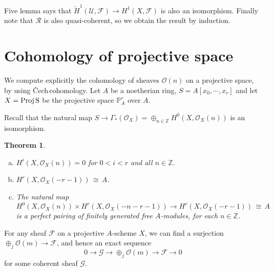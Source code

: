 \documentclass[12pt]{article}
\theoremstyle{plain}
\newtheorem{theorem}[equation]{Theorem}
\theoremstyle{definition}
\newcommand{\sU}{\mathcal{U}}
\newcommand{\IP}{\mathbb{P}}
\newcommand{\IZ}{\mathbb{Z}}
\newcommand{\sO}{\mathcal{O}}
\newcommand{\shF}{\mathscr{F}}
\newcommand{\shG}{\mathscr{G}}
\newcommand{\shR}{\mathscr{R}}
\newcommand{\Proj}{\rm Proj \,}
\newcommand\iso{{\, \cong \,}}
\newcommand{\<}{\langle}
\renewcommand{\>}{\rangle}
\newcommand{\Cech}{\v{C}ech\,}
\newcommand{\cH}{\check{H}}
\begin{document}
Five lemma says that $\cH^1(\sU, \shF) \to H^1(X, \shF)$ is also an isomorphism. Finally note that $\shR$ is also quasi-coherent, so we obtain the result by induction. 


\section{Cohomology of projective space}
We compute explicitly the cohomology of sheaves $\sO(n)$ on a projective space, by using \Cech cohomology. Let $A$ be a noetherian ring, $S = A[x_0, \cdots, x_r]$ and let $X = \Proj S$ be the projective space $\IP_A^r$ over $A$. 

Recall that the natural map $S \to \Gamma_*(\sO_X) = \oplus_{n \in \IZ} H^0(X, \sO_X(n))$ is an isomorphism. 

\begin{theorem}
\begin{enumerate}[a.]
\item $H^i(X, \sO_X(n)) = 0$ for $0 < i < r$ and all $n \in \IZ$. 
\item $H^r(X, \sO_X(-r - 1)) \iso A$. 
\item The natural map $H^0(X, \sO_X(n)) \times H^r(X, \sO_X(-n - r - 1)) \to H^r(X, \sO_X(-r - 1)) \iso A$ is a perfect pairing of finitely generated free $A$-modules, for each $n \in \IZ$. 
\end{enumerate}
\end{theorem}


For any sheaf $\shF$ on a projective $A$-scheme $X$, we can find a surjection
$\oplus_j \sO(m) \to \shF$, and hence an exact sequence 
$$ 0 \to \shG \to \oplus_j \sO(m) \to \shF \to 0$$ 
for some coherent sheaf $\shG$.  
\end{document}
